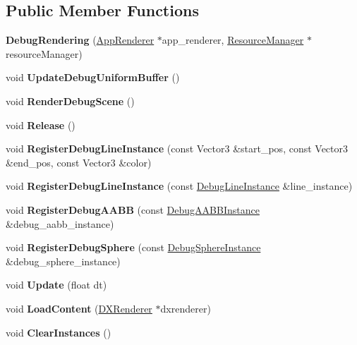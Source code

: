 \subsection*{Public Member Functions}
\begin{DoxyCompactItemize}
\item 
\mbox{\label{classDebugRendering_a04ef1665968e635ed878172cd43cd2ed}} 
{\bfseries Debug\+Rendering} (\hyperlink{classAppRenderer}{App\+Renderer} $\ast$app\+\_\+renderer, \hyperlink{classResourceManager}{Resource\+Manager} $\ast$resource\+Manager)
\item 
\mbox{\label{classDebugRendering_ab45f169c9f87018d13765d9949bba9c3}} 
void {\bfseries Update\+Debug\+Uniform\+Buffer} ()
\item 
\mbox{\label{classDebugRendering_a121f9a3ae8857077638c8f8030fc075c}} 
void {\bfseries Render\+Debug\+Scene} ()
\item 
\mbox{\label{classDebugRendering_ac6297a659a130d3e430c403faa608407}} 
void {\bfseries Release} ()
\item 
\mbox{\label{classDebugRendering_a4d86a142ed880456dbc732d213cc93e1}} 
void {\bfseries Register\+Debug\+Line\+Instance} (const Vector3 \&start\+\_\+pos, const Vector3 \&end\+\_\+pos, const Vector3 \&color)
\item 
\mbox{\label{classDebugRendering_a9e23739719cbe569a0afefa6bb203330}} 
void {\bfseries Register\+Debug\+Line\+Instance} (const \hyperlink{structDebugLineInstance}{Debug\+Line\+Instance} \&line\+\_\+instance)
\item 
\mbox{\label{classDebugRendering_a19e4cb443e7b0959dfd427431009acc4}} 
void {\bfseries Register\+Debug\+A\+A\+BB} (const \hyperlink{structDebugAABBInstance}{Debug\+A\+A\+B\+B\+Instance} \&debug\+\_\+aabb\+\_\+instance)
\item 
\mbox{\label{classDebugRendering_a43b18f36eff07b60f7dcace9549c126b}} 
void {\bfseries Register\+Debug\+Sphere} (const \hyperlink{structDebugSphereInstance}{Debug\+Sphere\+Instance} \&debug\+\_\+sphere\+\_\+instance)
\item 
\mbox{\label{classDebugRendering_acdce8201c1a8f304b70bf278fd7b9cdb}} 
void {\bfseries Update} (float dt)
\item 
\mbox{\label{classDebugRendering_a2b3fd46f7880bcf6a57eb1b3af5dbc6d}} 
void {\bfseries Load\+Content} (\hyperlink{classDXRenderer}{D\+X\+Renderer} $\ast$dxrenderer)
\item 
\mbox{\label{classDebugRendering_a9251ff1132aa73c074d369ddb6d7ab03}} 
void {\bfseries Clear\+Instances} ()
\end{DoxyCompactItemize}
